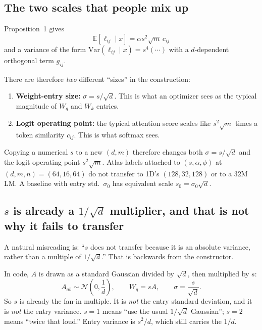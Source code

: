 \documentclass[11pt,a4paper]{report}
\begin{document}
\subsection{The two scales that people mix up}

Proposition~1 gives
\[
\mathbb{E}[\ell_{ij}\mid x]=\alpha s^2\sqrt{m}\,c_{ij}
\]
and a variance of the form $\mathrm{Var}(\ell_{ij}\mid x)=s^4(\cdots)$ with a $d$-dependent orthogonal term $g_{ij}$.

There are therefore \emph{two} different ``sizes'' in the construction:
\begin{enumerate}[leftmargin=*]
  \item \textbf{Weight-entry size:} $\sigma=s/\sqrt{d}$. This is what an optimizer sees as the typical magnitude of $W_q$ and $W_k$ entries.
  \item \textbf{Logit operating point:} the typical attention score scales like $s^2\sqrt{m}$ times a token similarity $c_{ij}$. This is what softmax sees.
\end{enumerate}

Copying a numerical $s$ to a new $(d,m)$ therefore changes both $\sigma=s/\sqrt{d}$ and the logit operating point $s^2\sqrt{m}$. Atlas labels attached to $(s,\alpha,\phi)$ at $(d,m,n)=(64,16,64)$ do not transfer to 1D's $(128,32,128)$ or to a 32M LM. A baseline with entry std.\ $\sigma_0$ has equivalent scale $s_0=\sigma_0\sqrt{d}$.

\subsection{\texorpdfstring{$s$ is already a $1/\sqrt{d}$ multiplier, and that is not why it fails to transfer}{s is already a 1/sqrt(d) multiplier, and that is not why it fails to transfer}}
\label{sec:s-not-absolute}

A natural misreading is: ``$s$ does not transfer because it is an absolute variance, rather than a multiple of $1/\sqrt{d}$.'' That is backwards from the constructor.

In code, $A$ is drawn as a standard Gaussian divided by $\sqrt{d}$, then multiplied by $s$:
\[
A_{ab}\sim\mathcal{N}\!\left(0,\frac{1}{d}\right),
\qquad
W_q=sA,
\qquad
\sigma = \frac{s}{\sqrt{d}}.
\]
So $s$ is already the fan-in multiple. It is \emph{not} the entry standard deviation, and it is \emph{not} the entry variance. $s=1$ means ``use the usual $1/\sqrt{d}$ Gaussian''; $s=2$ means ``twice that loud.'' Entry variance is $s^2/d$, which still carries the $1/d$.
\end{document}
